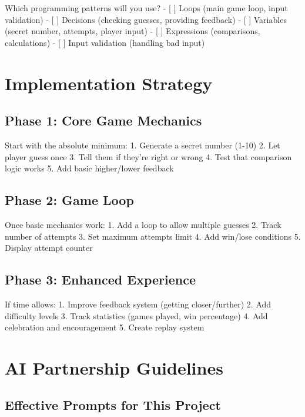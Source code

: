 \documentclass[
  letterpaper,
  DIV=11,
  numbers=noendperiod,
  oneside]{scrreprt}
\begin{document}
Which programming patterns will you use? - {[} {]} Loops (main game
loop, input validation) - {[} {]} Decisions (checking guesses, providing
feedback) - {[} {]} Variables (secret number, attempts, player input) -
{[} {]} Expressions (comparisons, calculations) - {[} {]} Input
validation (handling bad input)

\section{Implementation Strategy}\label{implementation-strategy-2}

\subsection{Phase 1: Core Game
Mechanics}\label{phase-1-core-game-mechanics}

Start with the absolute minimum: 1. Generate a secret number (1-10) 2.
Let player guess once 3. Tell them if they're right or wrong 4. Test
that comparison logic works 5. Add basic higher/lower feedback

\subsection{Phase 2: Game Loop}\label{phase-2-game-loop}

Once basic mechanics work: 1. Add a loop to allow multiple guesses 2.
Track number of attempts 3. Set maximum attempts limit 4. Add win/lose
conditions 5. Display attempt counter

\subsection{Phase 3: Enhanced
Experience}\label{phase-3-enhanced-experience}

If time allows: 1. Improve feedback system (getting closer/further) 2.
Add difficulty levels 3. Track statistics (games played, win percentage)
4. Add celebration and encouragement 5. Create replay system

\section{AI Partnership Guidelines}\label{ai-partnership-guidelines-2}

\subsection{Effective Prompts for This
Project}\label{effective-prompts-for-this-project-2}
\end{document}
